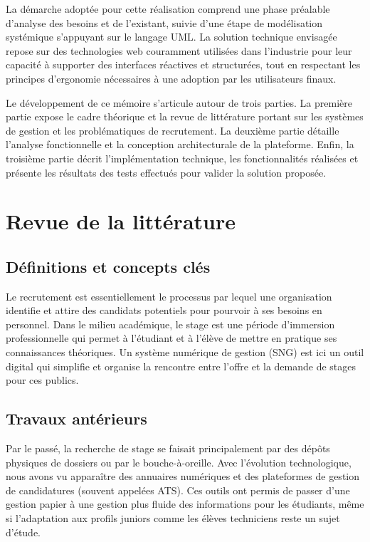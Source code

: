 \documentclass[12pt,a4paper,oneside]{memoir}
\begin{document}
	La démarche adoptée pour cette réalisation comprend une phase préalable d'analyse des besoins et de l'existant, suivie d'une étape de modélisation systémique s'appuyant sur le langage UML. La solution technique envisagée repose sur des technologies web couramment utilisées dans l'industrie pour leur capacité à supporter des interfaces réactives et structurées, tout en respectant les principes d'ergonomie nécessaires à une adoption par les utilisateurs finaux.
	
	Le développement de ce mémoire s'articule autour de trois parties. La première partie expose le cadre théorique et la revue de littérature portant sur les systèmes de gestion et les problématiques de recrutement. La deuxième partie détaille l'analyse fonctionnelle et la conception architecturale de la plateforme. Enfin, la troisième partie décrit l'implémentation technique, les fonctionnalités réalisées et présente les résultats des tests effectués pour valider la solution proposée.
	
	\chapter{Revue de la littérature}
	\section{Définitions et concepts clés}
	Le recrutement est essentiellement le processus par lequel une organisation identifie et attire des candidats potentiels pour pourvoir à ses besoins en personnel. Dans le milieu académique, le stage est une période d'immersion professionnelle qui permet à l'étudiant et à l'élève de mettre en pratique ses connaissances théoriques. Un système numérique de gestion (SNG) est ici un outil digital qui simplifie et organise la rencontre entre l'offre et la demande de stages pour ces publics.

	\section{Travaux antérieurs}
	Par le passé, la recherche de stage se faisait principalement par des dépôts physiques de dossiers ou par le bouche-à-oreille. Avec l'évolution technologique, nous avons vu apparaître des annuaires numériques et des plateformes de gestion de candidatures (souvent appelées ATS). Ces outils ont permis de passer d'une gestion papier à une gestion plus fluide des informations pour les étudiants, même si l'adaptation aux profils juniors comme les élèves techniciens reste un sujet d'étude.
\end{document}
